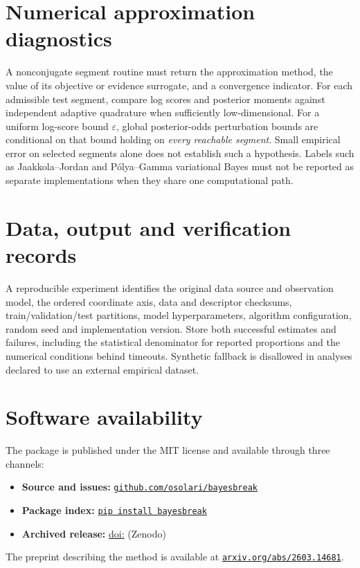 \section{Numerical approximation diagnostics}
A nonconjugate segment routine must return the approximation method, the value of its objective
or evidence surrogate, and a convergence indicator. For each admissible test segment, compare
log scores and posterior moments against independent adaptive quadrature when sufficiently
low-dimensional. For a uniform log-score bound $\varepsilon$, global posterior-odds perturbation
bounds are conditional on that bound holding on \emph{every reachable segment}. Small empirical
error on selected segments alone does not establish such a hypothesis. Labels such as
Jaakkola--Jordan and P\'olya--Gamma variational Bayes must not be reported as separate
implementations when they share one computational path.

\section{Data, output and verification records}
A reproducible experiment identifies the original data source and observation model, the ordered
coordinate axis, data and descriptor checksums, train/validation/test partitions, model
hyperparameters, algorithm configuration, random seed and implementation version. Store both
successful estimates and failures, including the statistical denominator for reported
proportions and the numerical conditions behind timeouts. Synthetic fallback is disallowed in
analyses declared to use an external empirical dataset.

\section{Software availability}
The \BayesBreak package is published under the MIT license and available through
three channels:
\begin{itemize}
  \item \textbf{Source and issues:} \href{\ProjectGitHub}{\texttt{github.com/osolari/bayesbreak}}
  \item \textbf{Package index:} \href{\ProjectPyPI}{\texttt{pip install bayesbreak}}
  \item \textbf{Archived release:} \href{\ProjectDOIURL}{doi:\ProjectDOI} (Zenodo)
\end{itemize}
The preprint describing the method is available at
\href{\ProjectArXiv}{\texttt{arxiv.org/abs/2603.14681}}.

